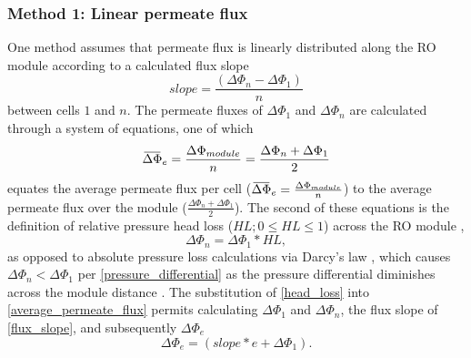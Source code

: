 \documentclass[journal=ACSES&TWater,manuscript=article]{achemso}
\newcommand{\overbar}[1]{\mkern 2.5mu\overline{\mkern-2.5mu#1\mkern-2.5mu}\mkern 2.5mu}
\begin{document}
\subsubsection{Method 1: Linear permeate flux}
One method assumes that permeate flux is linearly distributed along the RO module according to a calculated flux slope
\begin{equation} \label{flux_slope}
    slope = \frac{(\Delta \Phi_{n}-\Delta \Phi_{1})}{n}
\end{equation}
between cells $1$ and $n$. The permeate fluxes of $\Delta \Phi_{1}$ and $\Delta \Phi_{n}$ are calculated through a system of equations, one of which 
\begin{equation} \label{average_permeate_flux}
     \overbar{\Delta \Phi}_{e} = \frac{\Delta \Phi_{module}}{n} = \frac{\Delta \Phi_{n} + \Delta \Phi_{1}}{2}
\end{equation}
equates the average permeate flux per cell ($\overbar{\Delta \Phi}_{e} = \frac{\Delta \Phi_{module}}{n}$) to the average permeate flux over the module ($\frac{\Delta \Phi_{n} + \Delta \Phi_{1}}{2}$). The second of these equations is the definition of relative pressure head loss \cite{Srivathsan2014ReverseUnsteadiness,Gu2020ModelingNetworks} ($HL ; 0\le HL\le 1$) across the RO module \cite{Fraidenraich2009ReverseExperiment},
\begin{equation} \label{head_loss}
     \Delta \Phi_{n}= \Delta \Phi_{1}*HL,
\end{equation}
as opposed to absolute pressure loss calculations via Darcy's law \cite{Strubbe2018CalibrationFull-Scale}, which causes $\Delta \Phi_{n}<\Delta \Phi_{1}$ per \cref{pressure_differential} as the pressure differential diminishes across the module distance \cite{Li2016Three-dimensionalChannel}. The substitution of \cref{head_loss} into \cref{average_permeate_flux} permits calculating $\Delta \Phi_{1}$ and  $\Delta \Phi_{n}$, the flux slope of \cref{flux_slope}, and subsequently $\Delta \Phi_{e}$
\begin{equation} \label{intermediary_permeate_flux}
    \Delta \Phi_{e} = (slope*e+\Delta \Phi_{1}).
\end{equation}
\end{document}
